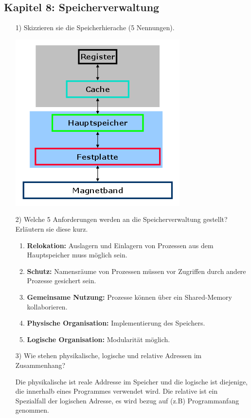 \documentclass[11pt,a4paper]{article}
\begin{document}
\subsection*{Kapitel 8: Speicherverwaltung}
\begin{itemize}
\item[1)] Skizzieren sie die Speicherhierache (5 Nennungen).

\includegraphics[scale=0.6]{hierachie.png}

\item[2)] Welche 5 Anforderungen werden an die Speicherverwaltung gestellt? Erläutern sie diese kurz.

\begin{enumerate}
\item \textbf{Relokation:} Auslagern und Einlagern von Prozessen aus dem Hauptspeicher muss möglich sein.
\item \textbf{Schutz:} Namensräume von Prozessen müssen vor Zugriffen durch andere Prozesse gesichert sein.
\item \textbf{Gemeinsame Nutzung:} Prozesse können über ein Shared-Memory kollaborieren.
\item \textbf{Physische Organisation:} Implementierung des Speichers.
\item \textbf{Logische Organisation:} Modularität möglich.
\end{enumerate}

\item[3)] Wie stehen physikalische, logische und relative Adressen im Zusammenhang?

Die physikalische ist reale Addresse im Speicher und die logische ist diejenige, die innerhalb eines Programmes verwendet wird. Die relative ist ein Spezialfall der logischen Adresse, es wird bezug auf (z.B) Programmanfang genommen.


\end{itemize}
\end{document}
